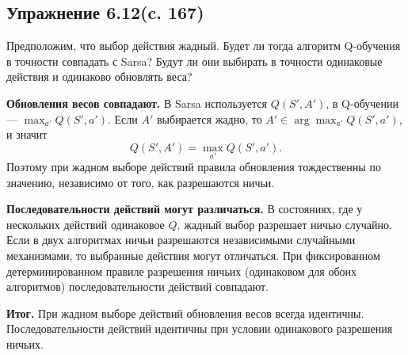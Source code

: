 \subsection{Упражнение 6.12(c. 167)}
Предположим, что выбор действия жадный. Будет ли тогда алгоритм Q-обучения в точности совпадать с Sarsa? Будут ли они выбирать в точности одинаковые действия и одинаково обновлять веса?
\begin{solution}
    \textbf{Обновления весов совпадают.} В Sarsa используется $Q(S', A')$, в Q-обучении — $\max_{a'} Q(S', a')$. Если $A'$ выбирается жадно, то $A' \in \arg\max_{a'} Q(S', a')$, и значит
    \[
    Q(S', A') = \max_{a'} Q(S', a').
    \]
    Поэтому при жадном выборе действий правила обновления тождественны по значению, независимо от того, как разрешаются ничьи.

    \textbf{Последовательности действий могут различаться.} В состояниях, где у нескольких действий одинаковое $Q$, жадный выбор разрешает ничью случайно. Если в двух алгоритмах ничьи разрешаются независимыми случайными механизмами, то выбранные действия могут отличаться. При фиксированном детерминированном правиле разрешения ничьих (одинаковом для обоих алгоритмов) последовательности действий совпадают.

    \textbf{Итог.} При жадном выборе действий обновления весов всегда идентичны. Последовательности действий идентичны при условии одинакового разрешения ничьих.
\end{solution}


